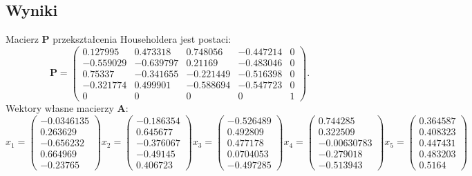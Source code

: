 \documentclass{article}
\begin{document}
\subsection{Wyniki}
Macierz \textbf{P} przekształcenia Householdera jest postaci:
\begin{equation}
	\textbf{P} = 
	\begin{pmatrix}
	 0.127995 & 0.473318 & 0.748056 & -0.447214 & 0 \\
	-0.559029 & -0.639797 & 0.21169 & -0.483046 & 0 \\
	0.75337 & -0.341655 & -0.221449 & -0.516398 & 0 \\
	-0.321774 & 0.499901 & -0.588694 & -0.547723 & 0 \\
	0 & 0 & 0 & 0 & 1	
	\end{pmatrix}.
\end{equation}
Wektory własne macierzy \textbf{A}:
\begin{equation}
x_1 = 
\begin{pmatrix}
	-0.0346135 \\ 0.263629 \\ -0.656232 \\ 0.664969 \\ -0.23765 
\end{pmatrix}
x_2 = 
\begin{pmatrix}
	-0.186354 \\ 0.645677 \\ -0.376067 \\ -0.49145 \\ 0.406723 
\end{pmatrix}
x_3 = 
\begin{pmatrix}
	-0.526489 \\ 0.492809 \\  0.477178 \\ 0.0704053 \\ -0.497285 
\end{pmatrix}
x_4 = 
\begin{pmatrix}
	0.744285 \\ 0.322509 \\ -0.00630783 \\ -0.279018  \\ -0.513943  
\end{pmatrix}
x_5 = 
\begin{pmatrix}
	0.364587 \\ 0.408323 \\ 0.447431 \\ 0.483203 \\ 0.5164 
\end{pmatrix}
\end{equation}
\end{document}
